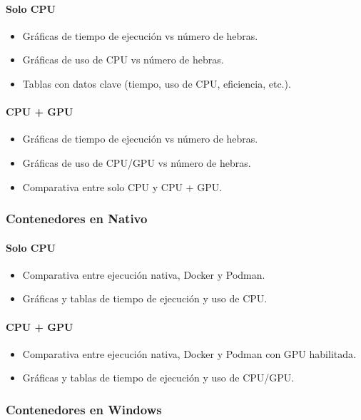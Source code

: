 \paragraph{Solo CPU}
\begin{itemize}
    \item Gráficas de tiempo de ejecución vs número de hebras.
    \item Gráficas de uso de CPU vs número de hebras.
    \item Tablas con datos clave (tiempo, uso de CPU, eficiencia, etc.).
\end{itemize}
\paragraph{CPU + GPU}
\begin{itemize}
    \item Gráficas de tiempo de ejecución vs número de hebras.
    \item Gráficas de uso de CPU/GPU vs número de hebras.
    \item Comparativa entre solo CPU y CPU + GPU.
\end{itemize}
\subsubsection{Contenedores en Nativo}
\paragraph{Solo CPU}
\begin{itemize}
    \item Comparativa entre ejecución nativa, Docker y Podman.
    \item Gráficas y tablas de tiempo de ejecución y uso de CPU.
\end{itemize}
\paragraph{CPU + GPU}
\begin{itemize}
    \item Comparativa entre ejecución nativa, Docker y Podman con GPU habilitada.
    \item Gráficas y tablas de tiempo de ejecución y uso de CPU/GPU.
\end{itemize}
\subsubsection{Contenedores en Windows}
